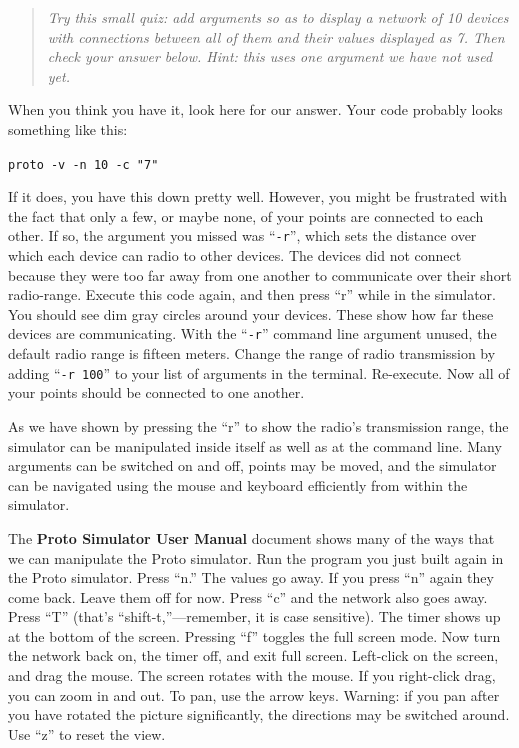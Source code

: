 \documentclass{article}
\newcommand\code[1]{\begin{center}\var{#1}\end{center}}
\newcommand\problem[1]{\begin{quote}{\em #1}\end{quote}}
\newcommand\var[1]{{\tt #1}}
\newcommand\qvar[1]{``{\tt #1}''}
\begin{document}
\problem{Try this small quiz: add arguments so as to display a network
  of 10 devices with connections between all of them and their values
  displayed as 7.  Then check your answer below.  Hint: this uses one
  argument we have not used yet.}

When you think you have it, look here for our answer. Your
code probably looks something like this:

\code{proto -v -n 10 -c "7"}

If it does, you have this down pretty well.  However, you might be
frustrated with the fact that only a few, or maybe none, of your
points are connected to each other.  If so, the argument you missed
was \qvar{-r}, which sets the distance over which each device can
radio to other devices.  The devices did not connect because they were
too far away from one another to communicate over their short
radio-range.  Execute this code again, and then press ``r'' while in
the simulator. You should see dim gray circles around your devices.
These show how far these devices are communicating. With the \qvar{-r}
command line argument unused, the default radio range is fifteen
meters.  Change the range of radio transmission by adding \qvar{-r
  100} to your list of arguments in the terminal.  Re-execute.  Now
all of your points should be connected to one another.

As we have shown by pressing the ``r'' to show the radio's
transmission range, the simulator can be manipulated inside itself as
well as at the command line.  Many arguments can be switched on and
off, points may be moved, and the simulator can be navigated using the
mouse and keyboard efficiently from within the simulator.

The {\bf Proto Simulator User Manual} document shows many of the ways
that we can manipulate the Proto simulator.  Run the program you just
built again in the Proto simulator. Press ``n.''  The values go away.
If you press ``n'' again they come back.  Leave them off for now.
Press ``c'' and the network also goes away.  Press ``T'' (that's
``shift-t,''---remember, it is case sensitive).  The timer shows up at
the bottom of the screen.  Pressing ``f'' toggles the full screen
mode.  Now turn the network back on, the timer off, and exit full
screen.  Left-click on the screen, and drag the mouse.  The screen
rotates with the mouse.  If you right-click drag, you can zoom in and
out.  To pan, use the arrow keys.  Warning: if you pan after you have
rotated the picture significantly, the directions may be switched
around.  Use ``z'' to reset the view.
\end{document}
